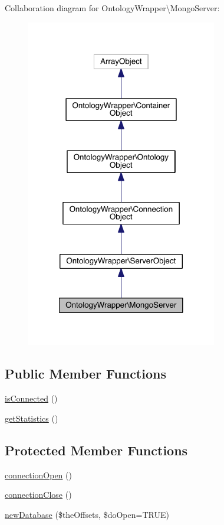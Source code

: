 Collaboration diagram for Ontology\-Wrapper\textbackslash{}Mongo\-Server\-:\nopagebreak
\begin{figure}[H]
\begin{center}
\leavevmode
\includegraphics[width=236pt]{class_ontology_wrapper_1_1_mongo_server__coll__graph}
\end{center}
\end{figure}
\subsection*{Public Member Functions}
\begin{DoxyCompactItemize}
\item 
\hyperlink{class_ontology_wrapper_1_1_mongo_server_a2bde1d3f28624801cbb42bf8b94673d4}{is\-Connected} ()
\item 
\hyperlink{class_ontology_wrapper_1_1_mongo_server_ad0339362ebaba5c344a179ef11d4e102}{get\-Statistics} ()
\end{DoxyCompactItemize}
\subsection*{Protected Member Functions}
\begin{DoxyCompactItemize}
\item 
\hyperlink{class_ontology_wrapper_1_1_mongo_server_abd478e3c641bbe1f40f7edf41e986558}{connection\-Open} ()
\item 
\hyperlink{class_ontology_wrapper_1_1_mongo_server_a0817afd4db82e176e0ebb6c7d5752e6e}{connection\-Close} ()
\item 
\hyperlink{class_ontology_wrapper_1_1_mongo_server_a111d5b677ba1a32f220cd21715ff04b8}{new\-Database} (\$the\-Offsets, \$do\-Open=T\-R\-U\-E)
\end{DoxyCompactItemize}
